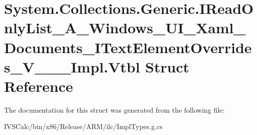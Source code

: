 \hypertarget{struct_system_1_1_collections_1_1_generic_1_1_i_read_only_list___a___windows___u_i___xaml___docu19797bf8df30f90399af17af45e36f94}{}\section{System.\+Collections.\+Generic.\+I\+Read\+Only\+List\+\_\+\+A\+\_\+\+Windows\+\_\+\+U\+I\+\_\+\+Xaml\+\_\+\+Documents\+\_\+\+I\+Text\+Element\+Overrides\+\_\+\+V\+\_\+\+\_\+\+\_\+\+Impl.\+Vtbl Struct Reference}
\label{struct_system_1_1_collections_1_1_generic_1_1_i_read_only_list___a___windows___u_i___xaml___docu19797bf8df30f90399af17af45e36f94}


The documentation for this struct was generated from the following file\+:\begin{DoxyCompactItemize}
\item 
I\+V\+S\+Calc/bin/x86/\+Release/\+A\+R\+M/ilc/Impl\+Types.\+g.\+cs\end{DoxyCompactItemize}
